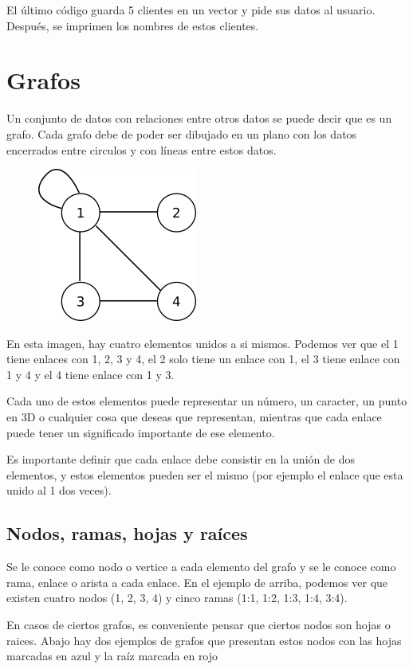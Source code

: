 \documentclass{article}
\begin{document}
El último código guarda 5 clientes en un vector y pide sus datos al usuario. Después, se imprimen los nombres de estos clientes.

\section{Grafos}

Un conjunto de datos con relaciones entre otros datos se puede decir que es un grafo. Cada grafo debe de poder ser dibujado en un plano con los datos encerrados entre circulos y con líneas entre estos datos.

\begin{figure}[H]
    \centering
    \includegraphics[width=0.15\paperwidth]{grafo}
\end{figure}

En esta imagen, hay cuatro elementos unidos a si mismos. Podemos ver que el 1 tiene enlaces con 1, 2, 3 y 4, el 2 solo tiene un enlace con 1, el 3 tiene enlace con 1 y 4 y el 4 tiene enlace con 1 y 3.

Cada uno de estos elementos puede representar un número, un caracter, un punto en 3D o cualquier cosa que deseas que representan, mientras que cada enlace puede tener un significado importante de ese elemento.

Es importante definir que cada enlace debe consistir en la unión de dos elementos, y estos elementos pueden ser el mismo (por ejemplo el enlace que esta unido al 1 dos veces).

\subsection{Nodos, ramas, hojas y raíces}

Se le conoce como nodo o vertice a cada elemento del grafo y se le conoce como rama, enlace o arista a cada enlace. En el ejemplo de arriba, podemos ver que existen cuatro nodos (1, 2, 3, 4) y cinco ramas (1:1, 1:2, 1:3, 1:4, 3:4).

En casos de ciertos grafos, es conveniente pensar que ciertos nodos son hojas o raices. Abajo hay dos ejemplos de grafos que presentan estos nodos con las hojas marcadas en azul y la raíz marcada en rojo
\end{document}
